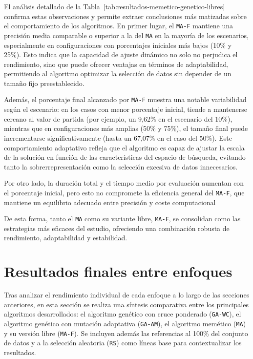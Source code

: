 El análisis detallado de la Tabla~\ref{tab:resultados-memetico-genetico-libres} confirma estas observaciones y permite extraer
conclusiones más matizadas sobre el comportamiento de los algoritmos.
En primer lugar, el \texttt{MA-F} mantiene una precisión media comparable o superior a la del \texttt{MA} en la mayoría de los escenarios,
especialmente en configuraciones con porcentajes iniciales más bajos (10\% y 25\%).
Esto indica que la capacidad de ajuste dinámico no solo no perjudica el rendimiento, sino que puede ofrecer ventajas en términos de adaptabilidad,
permitiendo al algoritmo optimizar la selección de datos sin depender de un tamaño fijo preestablecido.

Además, el porcentaje final alcanzado por \texttt{MA-F} muestra una notable variabilidad según el escenario:
en los casos con menor porcentaje inicial, tiende a mantenerse cercano al valor de partida (por ejemplo, un 9,62\% en el escenario del 10\%),
mientras que en configuraciones más amplias (50\% y 75\%), el tamaño final puede incrementarse significativamente (hasta un 67,07\% en el caso del 50\%).
Este comportamiento adaptativo refleja que el algoritmo es capaz de ajustar la escala de la solución en función de las características del espacio de búsqueda,
evitando tanto la sobrerrepresentación como la selección excesiva de datos innecesarios.

Por otro lado, la duración total y el tiempo medio por evaluación aumentan con el porcentaje inicial, pero esto no compromete la eficiencia general del \texttt{MA-F},
que mantiene un equilibrio adecuado entre precisión y coste computacional

De esta forma, tanto el \texttt{MA} como su variante libre, \texttt{MA-F}, se consolidan como las estrategias más eficaces del estudio,
ofreciendo una combinación robusta de rendimiento, adaptabilidad y estabilidad.


\section{Resultados finales entre enfoques}\label{sec:comparacion-final-enfoques}
Tras analizar el rendimiento individual de cada enfoque a lo largo de las secciones anteriores,
en esta sección se realiza una síntesis comparativa entre los principales algoritmos desarrollados: el algoritmo genético con cruce ponderado (\texttt{GA-WC}), el algoritmo genético con mutación adaptativa (\texttt{GA-AM}), el algoritmo memético (\texttt{MA}) y su versión libre (\texttt{MA-F}).
Se incluyen además las referencias al 100\% del conjunto de datos y a la selección aleatoria (\texttt{RS})
como líneas base para contextualizar los resultados.

